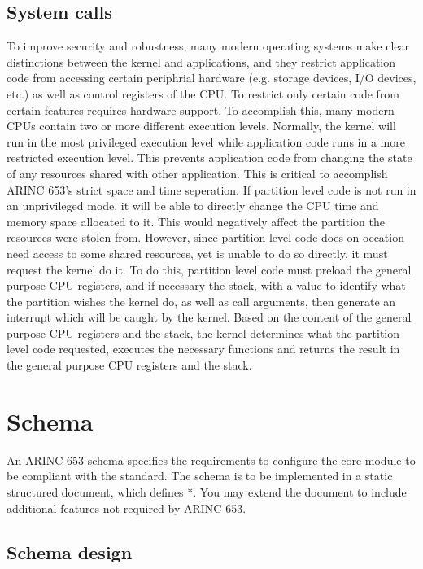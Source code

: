 \subsection{System calls}
To improve security and robustness, many modern operating systems make clear 
distinctions between the kernel and applications, and they restrict application
code from accessing certain periphrial hardware (e.g. storage devices, I/O
devices, etc.) as well as control registers of the CPU. 
To restrict only certain code from certain features requires hardware support.
To accomplish this, many modern CPUs contain two or more different execution
levels. Normally, the kernel will run in the most privileged execution level
while application code runs in a more restricted execution level. This prevents
application code from changing the state of any resources shared with other
application. This is critical to accomplish ARINC 653's strict space and time 
seperation. If partition level code is not run in an unprivileged mode, it will
be able to directly change the CPU time and memory space allocated to it. This
would negatively affect the partition the resources were stolen from. However,
since partition level code does on occation need access to some shared resources,
yet is unable to do so directly, it must request the kernel do it. To do this,
partition level code must preload the general purpose CPU registers, and if
necessary the stack, with a value to identify what the partition wishes the
kernel do, as well as call arguments, then generate an interrupt which will be
caught by the kernel. Based on the content of the general purpose CPU registers
and the stack, the kernel determines what the partition level code requested,
executes the necessary functions and returns the result in the general purpose 
CPU registers and the stack.

\section{Schema}

An ARINC 653 schema specifies the requirements to configure the core module to be compliant with the standard. The schema is to be implemented in a static structured document, which defines *. You may extend the document to include additional features not required by ARINC 653.

\subsection{Schema design}

